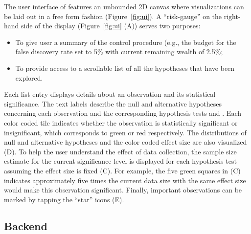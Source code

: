 The user interface of \system{} features an unbounded 2D canvas where visualizations can be laid out in a free form fashion (Figure~\ref{fig:ui}). A ``risk-gauge'' on the right-hand side of the display (Figure~\ref{fig:ui} (A)) serves two purposes: 
\begin{itemize}
    \item To give user a summary of the control procedure (e.g., the budget for the false discovery rate set to 5\% with current remaining wealth of 2.5\%;
    \item To provide access to a scrollable list of all the hypotheses that have been explored.
\end{itemize}
Each list entry displays details about an observation and its statistical significance.  The text labels describe the null and alternative hypotheses concerning each observation and the corresponding hypothesis tests and \pvals. Each color coded tile indicates whether the observation is statistically significant or insignificant, which corresponds to green or red respectively.  The distributions of null and alternative hypotheses and the color coded effect size are also visualized (D).  To help the user understand the effect of data collection, the sample size estimate for the current significance level is displayed for each hypothesis test assuming the effect size is fixed (C).  For example, the five green squares in (C) indicates approximately five times the current data size with the same effect size would make this observation significant. Finally, important observations can be marked by tapping the ``star'' icons (E).

\subsection{Backend}
\label{sec:backend}
